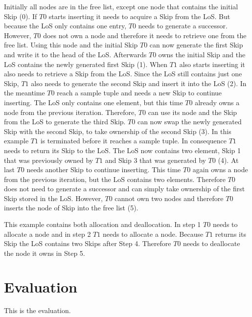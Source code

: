 \documentclass[sigconf,nonacm]{acmart}
\begin{document}
        Initially all nodes are in the free list, except one node that contains the initial Skip (0). If $T0$ starts inserting it needs to acquire a Skip from the LoS. But because the LoS only contains one entry, $T0$ needs to generate a successor. However, $T0$ does not own a node and therefore it needs to retrieve one from the free list. Using this node and the initial Skip $T0$ can now generate the first Skip and write it to the head of the LoS. Afterwards $T0$ owns the initial Skip and the LoS contains the newly generated first Skip (1). When $T1$ also starts inserting it also needs to retrieve a Skip from the LoS. Since the LoS still contains just one Skip, $T1$ also needs to generate the second Skip and insert it into the LoS (2). In the meantime $T0$ reach a sample tuple and needs a new Skip to continue inserting. The LoS only contains one element, but this time $T0$ already owns a node from the previous iteration. Therefore, $T0$ can use its node and the Skip from the LoS to generate the third Skip. $T0$ can now swap the newly generated Skip with the second Skip, to take ownership of the second Skip (3). In this example $T1$ is terminated before it reaches a sample tuple. In consequence $T1$ needs to return its Skip to the LoS. The LoS now contains two element, Skip 1 that was previously owned by $T1$ and Skip 3 that was generated by $T0$ (4). At last $T0$ needs another Skip to continue inserting. This time $T0$ again owns a node from the previous iteration, but the LoS contains two elements. Therefore $T0$ does not need to generate a successor and can simply take ownership of the first Skip stored in the LoS. However, $T0$ cannot own two nodes and therefore $T0$ inserts the node of Skip into the free list (5).

        This example contains both allocation and deallocation. In step 1 $T0$ needs to allocate a node and in step 2 $T1$ needs to allocate a node. Because $T1$ returns its Skip the LoS contains two Skips after Step 4. Therefore $T0$ needs to deallocate the node it owns in Step 5.


    \section{Evaluation}
        This is the evaluation.
\end{document}
